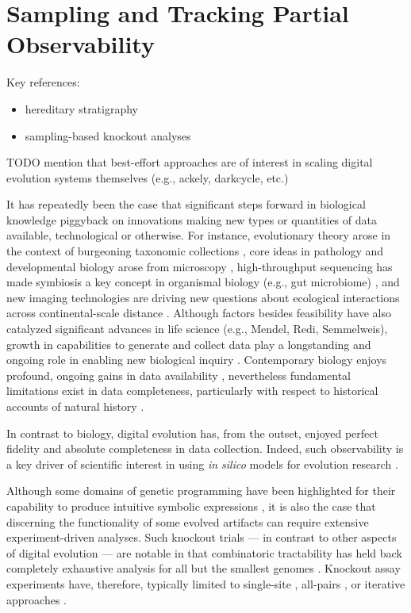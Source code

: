 \section{Sampling and Tracking Partial Observability}
\label{sec:best-effort}

Key references:
\begin{itemize}
\item hereditary stratigraphy \citep{moreno2022hereditary,moreno2024guide}
\item sampling-based knockout analyses \citep{moreno2024methods}
\end{itemize}

TODO mention that best-effort approaches are of interest in scaling digital evolution systems themselves (e.g., ackely, darkcycle, etc.)

\citep{moreno2022hstrat,moreno2024guide}

It has repeatedly been the case that significant steps forward in biological knowledge piggyback on innovations making new types or quantities of data available, technological or otherwise.
For instance, evolutionary theory arose in the context of burgeoning taxonomic collections \citep{winsor2009taxonomy}, core ideas in pathology and developmental biology arose from microscopy \citep{turner1890cell}, high-throughput sequencing has made symbiosis a key concept in organismal biology (e.g., gut microbiome) \citep{durack2018gut}, and new imaging technologies are driving new questions about ecological interactions across continental-scale distance \citep{stark2016toward}.
Although factors besides feasibility have also catalyzed significant advances in life science (e.g., Mendel, Redi, Semmelweis), growth in capabilities to generate and collect data play a longstanding and ongoing role in enabling new biological inquiry \citep{strasser2012data}.
Contemporary biology enjoys profound, ongoing gains in data availability \citep{sulston1983embryonic,sheth2017multiplex,weeks2022deep}, nevertheless fundamental limitations exist in data completeness, particularly with respect to historical accounts of natural history \citep{benton2011assessing,delsuc2005phylogenomics}.

In contrast to biology, digital evolution has, from the outset, enjoyed perfect fidelity and absolute completeness in data collection.
Indeed, such observability is a key driver of scientific interest in using \textit{in silico} models for evolution research \citep{oneil2003digital}.

Although some domains of genetic programming have been highlighted for their capability to produce intuitive symbolic expressions \citep{hu2023genetic,javed2022simplification}, it is also the case that discerning the functionality of some evolved artifacts can require extensive experiment-driven analyses.
Such knockout trials --- in contrast to other aspects of digital evolution --- are notable in that combinatoric tractability has held back completely exhaustive analysis for all but the smallest genomes \citep{nitash2021information}.
Knockout assay experiments have, therefore, typically limited to single-site \citep{adami2006digital}, all-pairs \citep{kumawat2024evolution}, or iterative approaches \citep{langdon2014improving,moreno2021case}.

